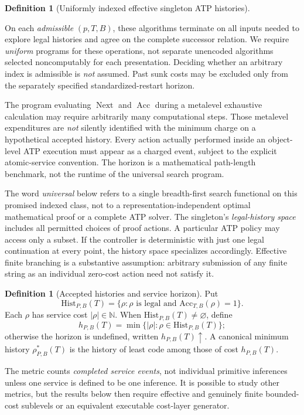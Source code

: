 \documentclass[11pt]{article}
\theoremstyle{definition}
\newtheorem{definition}[theorem]{Definition}
\newcommand{\Hist}{\mathrm{Hist}}
\newcommand{\bbN}{\mathbb{N}}
\begin{document}
\begin{definition}[Uniformly indexed effective singleton ATP histories]
\begin{enumerate}[label=(\roman*)]
\end{enumerate}
On each \emph{admissible} $(p,T,B)$, these algorithms terminate on all inputs needed to explore legal histories and agree on the complete successor relation. We require \emph{uniform} programs for these operations, not separate unencoded algorithms selected noncomputably for each presentation. Deciding whether an arbitrary index is admissible is \emph{not} assumed. Past sunk costs may be excluded only from the separately specified standardized-restart horizon.
\end{definition}

The program evaluating $\operatorname{Next}$ and $\operatorname{Acc}$ during a metalevel exhaustive calculation may require arbitrarily many computational steps. Those metalevel expenditures are \emph{not} silently identified with the minimum charge on a hypothetical accepted history. Every action actually performed inside an object-level ATP execution must appear as a charged event, subject to the explicit atomic-service convention. The horizon is a mathematical path-length benchmark, not the runtime of the universal search program.

The word \emph{universal} below refers to a single breadth-first search functional on this promised indexed class, not to a representation-independent optimal mathematical proof or a complete ATP solver. The singleton's \emph{legal-history space} includes all permitted choices of proof actions. A particular ATP policy may access only a subset. If the controller is deterministic with just one legal continuation at every point, the history space specializes accordingly. Effective finite branching is a substantive assumption: arbitrary submission of any finite string as an individual zero-cost action need not satisfy it.

\begin{definition}[Accepted histories and service horizon]
Put
\[
\Hist_{P,B}(T)=\{\rho:\rho\text{ is legal and }\mathrm{Acc}_{T,B}(\rho)=1\}.
\]
Each $\rho$ has service cost $|\rho|\in\bbN$. When $\Hist_{P,B}(T)\ne\varnothing$, define
\[
 h_{P,B}(T)=\min\{|\rho|:\rho\in\Hist_{P,B}(T)\};
\]
otherwise the horizon is undefined, written $h_{P,B}(T)\uparrow$. A canonical minimum history $\rho^*_{P,B}(T)$ is the history of least code among those of cost $h_{P,B}(T)$.
\end{definition}

The metric counts \emph{completed service events}, not individual primitive inferences unless one service is defined to be one inference. It is possible to study other metrics, but the results below then require effective and genuinely finite bounded-cost sublevels or an equivalent executable cost-layer generator.
\end{document}
